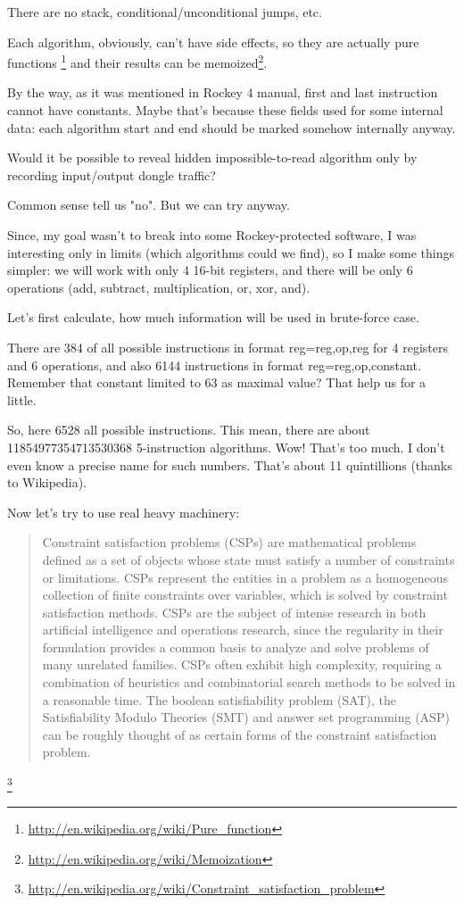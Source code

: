 There are no stack, conditional/unconditional jumps, etc.

Each algorithm, obviously, can't have side effects, so they are actually pure functions
\footnote{\url{http://en.wikipedia.org/wiki/Pure_function}} and their results can be 
memoized\footnote{\url{http://en.wikipedia.org/wiki/Memoization}}.

By the way, as it was mentioned in Rockey 4 manual, first and last instruction cannot have constants. Maybe that's because these fields used for some internal data: each algorithm start and end should be marked somehow internally anyway.

Would it be possible to reveal hidden impossible-to-read algorithm only by recording input/output dongle traffic?

Common sense tell us "no". But we can try anyway.

Since, my goal wasn't to break into some Rockey-protected software, I was interesting only in limits (which algorithms could we find), so I make some things simpler: we will work with only 4 16-bit registers, and there will be only 6 operations (add, subtract, multiplication, or, xor, and).

Let's first calculate, how much information will be used in brute-force case.

There are 384 of all possible instructions in format reg=reg,op,reg for 4 registers and 6 operations, and also 6144 instructions in format reg=reg,op,constant. Remember that constant limited to 63 as maximal value? That help us for a little.

So, here 6528 all possible instructions. This mean, there are about 11854977354713530368 5-instruction algorithms. Wow! That's too much. I don't even know a precise name for such numbers. That's about 11 quintillions (thanks to Wikipedia).

Now let's try to use real heavy machinery:

\begin{framed}
\begin{quotation}
Constraint satisfaction problems (CSPs) are mathematical problems defined as a set of objects whose state must satisfy a number of constraints or limitations. CSPs represent the entities in a problem as a homogeneous collection of finite constraints over variables, which is solved by constraint satisfaction methods. CSPs are the subject of intense research in both artificial intelligence and operations research, since the regularity in their formulation provides a common basis to analyze and solve problems of many unrelated families. CSPs often exhibit high complexity, requiring a combination of heuristics and combinatorial search methods to be solved in a reasonable time. The boolean satisfiability problem (SAT), the Satisfiability Modulo Theories (SMT) and answer set programming (ASP) can be roughly thought of as certain forms of the constraint satisfaction problem.
\end{quotation}
\end{framed}\footnote{\url{http://en.wikipedia.org/wiki/Constraint_satisfaction_problem}}

